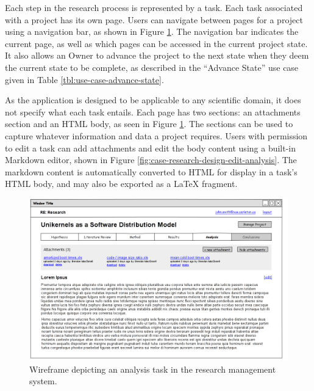 \documentclass[document.tex]{subfiles}
\begin{document}
Each step in the research process is represented by a task. Each task associated with a project has its own page. Users can navigate between pages for a project using a navigation bar, as shown in Figure \ref{fig:case-research-design-view-analysis}. The navigation bar indicates the current page, as well as which pages can be accessed in the current project state. It also allows an Owner to advance the project to the next state when they deem the current state to be complete, as described in the ``Advance State'' use case given in Table \ref{tbl:use-case-advance-state}.

As the application is designed to be applicable to any scientific domain, it does not specify what each task entails.
Each page has two sections: an attachments section and an HTML body, as seen in Figure \ref{fig:case-research-design-view-analysis}.
The sections can be used to capture whatever information and data a project requires.
Users with permission to edit a task can add attachments and edit the body content using a built-in Markdown editor, shown in Figure \ref{fig:case-research-design-edit-analysis}.
The markdown content is automatically converted to HTML for display in a task's HTML body, and may also be exported as a LaTeX fragment.

\begin{figure}[!ht]
\centering \includegraphics[width=5.5in]{./img/case-study-research-railgun/mockup-view-analysis}
\caption{Wireframe depicting an analysis task in the research management system.}
\label{fig:case-research-design-view-analysis}
\end{figure}
\end{document}

